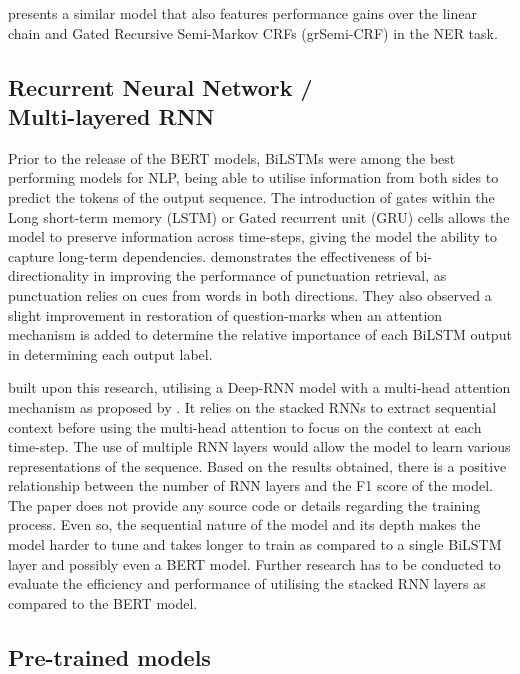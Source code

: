 \documentclass[a4paper]{article}
\begin{document}
\begin{multicols}{2}
\cite{hybridsemimarkovcrf} presents a similar model that also features performance gains over the linear chain and Gated Recursive
Semi-Markov CRFs (grSemi-CRF) \citep{grsemicrf} in the NER task. 



\subsection{\texorpdfstring{Recurrent Neural Network / \\ Multi-layered RNN}{Recurrent Neural Network / Multi-layered RNN}}
Prior to the release of the BERT models, BiLSTMs were among the best performing models for NLP, being able to utilise information from both sides to predict the tokens of the output sequence. The introduction of gates within the Long short-term memory (LSTM) or Gated recurrent unit (GRU) cells allows the model to preserve information across time-steps, giving the model the ability to capture long-term dependencies.  
\cite{birnnattention} demonstrates the effectiveness of bi-directionality in improving the performance of punctuation retrieval, as punctuation relies on cues from words in both directions. They also observed a slight improvement in restoration of question-marks when an attention mechanism is added to determine the relative importance of each BiLSTM output in determining each output label.

\cite{kim_2019} built upon this research, utilising a Deep-RNN model with a multi-head attention mechanism as proposed by \cite{attentionisallyouneed}. It relies on the stacked RNNs to extract sequential context before using the multi-head attention to focus on the context at each time-step. The use of multiple RNN layers would allow the model to learn various representations of the sequence. Based on the results obtained, there is a positive relationship between the number of RNN layers and the F1 score of the model. The paper does not provide any source code or details regarding the training process. Even so, the sequential nature of the model and its depth makes the model harder to tune and takes longer to train as compared to a single BiLSTM layer and possibly even a BERT model. Further research has to be conducted to evaluate the efficiency and performance of utilising the stacked RNN layers as compared to the BERT model.

\subsection{Pre-trained models}

\end{multicols}
\end{document}
